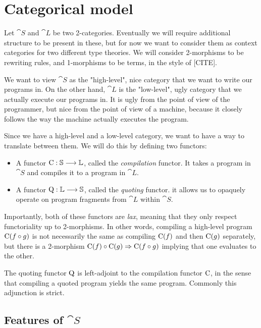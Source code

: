 \section{Categorical model}\label{sec:model}

Let $\cat S$ and $\cat L$ be two 2-categories. Eventually we will require
additional structure to be present in these, but for now we want to consider
them as context categories for two different type theories. We will consider
2-morphisms to be rewriting rules, and 1-morphisms to be terms, in the style of
  [CITE].

We want to view $\cat S$ as the "high-level", nice category that we want to
write our programs in. On the other hand, $\cat L$ is the "low-level", ugly
category that we actually execute our programs in. It is ugly from the point of
view of the programmer, but nice from the point of view of a machine, because
it closely follows the way the machine actually executes the program.

Since we have a high-level and a low-level category, we want to have a way to
translate between them. We will do this by defining two functors:
\begin{itemize}
  \item A functor $\mathrm C : \mathbb S \longrightarrow \mathbb L $, called the \emph{compilation}
        functor. It takes a program in $\cat S$ and compiles it to a program in $\cat
          L$.
  \item A functor $\mathrm Q : \mathbb L \longrightarrow \mathbb S $, called the \emph{quoting}
        functor. it allows us to opaquely operate on program fragments from $\cat L$
        within $\cat S$.
\end{itemize}

Importantly, both of these functors are \emph{lax}, meaning that they only
respect functoriality up to 2-morphisms. In other words, compiling a high-level
program $\mathrm C(f \circ g)$ is not necessarily the same as compiling $\mathrm
  C(f)$ and then $\mathrm C(g)$ separately, but there is a 2-morphism $\mathrm C(f)
  \circ \mathrm C(g) \Rightarrow \mathrm C(f \circ g)$ implying that one evaluates to
the other.

The quoting functor $\mathrm Q$ is left-adjoint to the compilation functor $\mathrm
  C$, in the sense that compiling a quoted program yields the same program.
Commonly this adjunction is strict.

\subsection{Features of $\cat S$}

